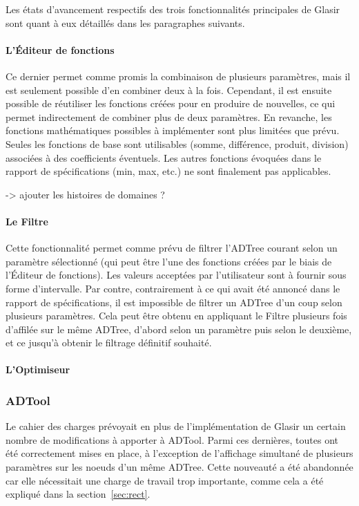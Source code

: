 Les états d'avancement respectifs des trois fonctionnalités principales de Glasir sont quant à eux détaillés dans les paragraphes suivants.

\paragraph{L'Éditeur de fonctions} Ce dernier permet comme promis la combinaison de plusieurs paramètres, mais il est seulement possible d'en combiner deux à la fois. Cependant, il est ensuite possible de réutiliser les fonctions créées pour en produire de nouvelles, ce qui permet indirectement de combiner plus de deux paramètres. En revanche, les fonctions mathématiques possibles à implémenter sont plus limitées que prévu. Seules les fonctions de base sont utilisables (somme, différence, produit, division) associées à des coefficients éventuels. Les autres fonctions évoquées dans le rapport de spécifications (min, max, etc.) ne sont finalement pas applicables.

-> ajouter les histoires de domaines ?

\paragraph{Le Filtre} Cette fonctionnalité permet comme prévu de filtrer l'ADTree courant selon un paramètre sélectionné (qui peut être l'une des fonctions créées par le biais de l'Éditeur de fonctions). Les valeurs acceptées par l'utilisateur sont à fournir sous forme d'intervalle. Par contre, contrairement à ce qui avait été annoncé dans le rapport de spécifications, il est impossible de filtrer un ADTree d'un coup selon plusieurs paramètres. Cela peut être obtenu en appliquant le Filtre plusieurs fois d'affilée sur le même ADTree, d'abord selon un paramètre puis selon le deuxième, et ce jusqu'à obtenir le filtrage définitif souhaité.

\paragraph{L'Optimiseur}

\subsubsection{ADTool}
\label{sssec:obj_adtool}

Le cahier des charges prévoyait en plus de l'implémentation de Glasir un certain nombre de modifications à apporter à ADTool. Parmi ces dernières, toutes ont été correctement mises en place, à l'exception de l'affichage simultané de plusieurs paramètres sur les noeuds d'un même ADTree. Cette nouveauté a été abandonnée car elle nécessitait une charge de travail trop importante, comme cela a été expliqué dans la {\sc section}~\ref{sec:rect}.

